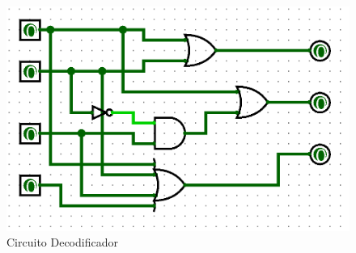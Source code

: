 \begin{figure}[hbt!]
    \centering
    \includegraphics[height = 0.33\textheight]{recursos/Ejercicio4/CircuitoDecodificador.png}\par
    \caption*{Circuito Decodificador}
\end{figure} 

